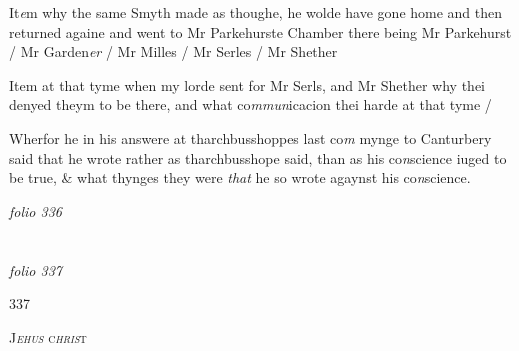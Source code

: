 \documentclass[12pt, a4paper]{book}
\begin{document}
		\ifthenelse{\isodd{\thepage}}
		{\reversemarginpar}
		{\normalmarginpar}
		It\textit{e}m why the same Smyth made as thoughe, he wolde have gone home
and then returned againe and went to Mr Parkehurste Chamber
there being Mr Parkehurst / Mr Garden\textit{er} / Mr Milles / Mr Serles / Mr 
Shether

            		
				\marginpar[\vspace{0.5cm}{\textcolor{Gray}{13}}]{}
			
		\ifthenelse{\isodd{\thepage}}
		{\reversemarginpar}
		{\normalmarginpar}
		Item at that tyme when my lorde sent for Mr Serls, and Mr Shether
why thei denyed theym to be there, and what co\textit{mmun}icacion thei harde at
that tyme /

            		
				\marginpar[\vspace{0.5cm}{\textcolor{Gray}{14}}]{}
			 
		\ifthenelse{\isodd{\thepage}}
		{\reversemarginpar}
		{\normalmarginpar}
		Wherfor he in his answere at tharchbusshoppes last co\textit{m}
mynge to Canturbery said that he wrote rather as 
tharchbusshope said, than as his co\textit{n}science iuged to be 
true, \& what thynges they were \textit{that} he so wrote 
agaynst his co\textit{n}science.

\dotfill
						\newpage
{}

\textit{folio 336}


         \vspace*{4cm}
         
\dotfill
						  \section*{}  \subsection*{}

\textit{folio 337}



\begin{flushright}{\color{Mahogany}337}\end{flushright}

				\begin{center} \begin{large} {\scshape J\textit{ehus} c\textit{hris}t} \end{large} \end{center}
			
\end{document}
